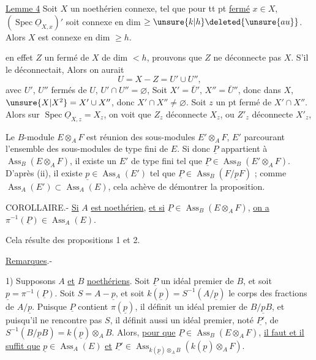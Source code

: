 \uline{Lemme 4} Soit $X$ un 
noethérien connexe, 
tel que pour tt pt \uline{fermé} $x\in X$, $(\operatorname{Spec}\underline{O}_{X,x})'$ soit connexe
en dim $\geq\unsure{k|h}\deleted{\unsure{au}}$. Alors $X$ est connexe
en dim $\geq h$.


 en effet  $Z$ un
fermé de $X$ de dim $<h$,
prouvons que $Z$ ne déconnecte pas $X$.
 S'il le déconnectait,
Alors on aurait
\[
U=X-Z=U'\cup U'',
\]
avec $U'$, $U''$ fermés de $U$, $U'\cap U''=\varnothing$,
Soit $X'=\bar U'$, $X''=\bar U''$, donc 
dans $X$, $\unsure{X|X^2}=X'\cup X''$, donc $X'\cap X''\ne\varnothing$.
Soit $z$ un pt fermé de $X'\cap X''$.
Alors  sur $\operatorname{Spec}\underline{O}_{X,z}=X_z$,
on voit que $Z_z$ déconnecte $X_z$,
ou $Z'_z$ déconnecte $X'_z$, 


Le $B$-module $E\otimes_A F$ est réunion des sous-modules $E'\otimes_A F$, $E'$ parcourant
l'ensemble des sous-modules de type fini de $E$. Si donc $\underline P$ appartient à
$\operatorname{Ass}_B(E\otimes_A F)$, il existe un $E'$ de type fini tel que $\underline P\in\operatorname{Ass}_B(E'\otimes_A F)$. D'après
(ii), il existe $\underline p\in\operatorname{Ass}_A(E')$ tel que $\underline P\in\operatorname{Ass}_B(F/\underline pF)$ ; comme
$\operatorname{Ass}_A(E')\subset\operatorname{Ass}_A(E)$, cela achève de démontrer la proposition.

COROLLAIRE.- \uline{Si} $A$ \uline{est noethérien}, \uline{et si} $\underline P\in\operatorname{Ass}_B(E\otimes_A F)$, \uline{on a}
$\pi^{-1}(\underline P)\in\operatorname{Ass}_A(E)$.

Cela résulte des propositions 1 et 2.

\uline{Remarques}.-

1) Supposons $A$ \uline{et} $B$ \uline{noethériens}. Soit $\underline P$ un idéal premier de $B$, et soit
$\underline p=\pi^{-1}(\underline P)$. Soit $S=A-\underline p$, et soit $k(\underline p)=S^{-1}(A/\underline p)$ le corps des fractions
de $A/\underline p$. Puisque $\underline P$ contient $\pi(\underline p)$, il définit un idéal premier de $B/\underline pB$, et
puisqu'il ne rencontre pas $S$, il définit aussi un idéal premier, noté $\underline{P'}$,
de $S^{-1}(B/\underline pB)=k(\underline p)\otimes_A B$. Alors, \uline{pour que} $\underline P\in\operatorname{Ass}_B(E\otimes_A F)$, \uline{il faut et il}
\uline{suffit que} $\underline p\in\operatorname{Ass}_A(E)$ \uline{et} $\underline{P'}\in\operatorname{Ass}_{k(\underline p)\otimes_A B}(k(\underline p)\otimes_A F)$.

